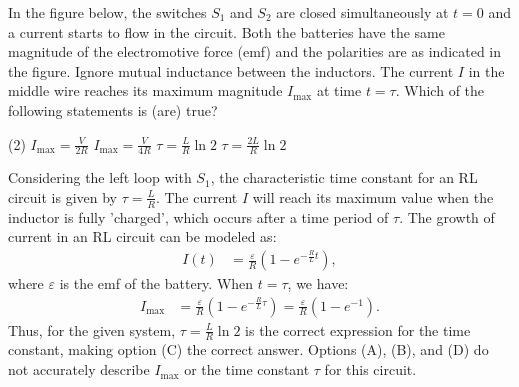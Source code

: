 
\item In the figure below, the switches \( S_1 \) and \( S_2 \) are closed simultaneously at \( t = 0 \) and a current starts to flow in the circuit. Both the batteries have the same magnitude of the electromotive force (emf) and the polarities are as indicated in the figure. Ignore mutual inductance between the inductors. The current \( I \) in the middle wire reaches its maximum magnitude \( I_{\text{max}} \) at time \( t = \tau \). Which of the following statements is (are) true?
\begin{center}
\end{center}
    \begin{tasks}(2)
        \task \( I_{\text{max}} = \frac{V}{2R} \)
        \task \( I_{\text{max}} = \frac{V}{4R} \)
        \task \( \tau = \frac{L}{R} \ln 2 \)
        \task \( \tau = \frac{2L}{R} \ln 2 \)
    \end{tasks}
    
    \begin{solution}
        Considering the left loop with \( S_1 \), the characteristic time constant for an RL circuit is given by \( \tau = \frac{L}{R} \).
    The current \( I \) will reach its maximum value when the inductor is fully 'charged', which occurs after a time period of \( \tau \).
    The growth of current in an RL circuit can be modeled as:
        \begin{align*}
            I(t) &= \frac{\varepsilon}{R} \left(1 - e^{-\frac{R}{L}t}\right),
        \end{align*}
        where \( \varepsilon \) is the emf of the battery. When \( t = \tau \), we have:
        \begin{align*}
            I_{\text{max}} &= \frac{\varepsilon}{R} \left(1 - e^{-\frac{R}{L}\tau}\right) = \frac{\varepsilon}{R} \left(1 - e^{-1}\right).
        \end{align*}
        Thus, for the given system, \( \tau = \frac{L}{R} \ln 2 \) is the correct expression for the time constant, making option (C) the
    correct answer. Options (A), (B), and (D) do not accurately describe \( I_{\text{max}} \) or the time constant \( \tau \) for this
    circuit.
    \end{solution}